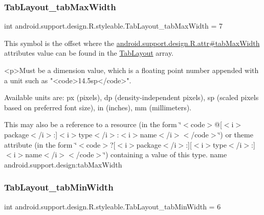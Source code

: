 \subsubsection{\texorpdfstring{Tab\+Layout\+\_\+tab\+Max\+Width}{TabLayout\_tabMaxWidth}}
{\footnotesize\ttfamily int android.\+support.\+design.\+R.\+styleable.\+Tab\+Layout\+\_\+tab\+Max\+Width = 7\hspace{0.3cm}{\ttfamily [static]}}

This symbol is the offset where the \hyperlink{classandroid_1_1support_1_1design_1_1R_1_1attr_a650581c154950889e3bd6241f121f180}{android.\+support.\+design.\+R.\+attr\#tab\+Max\+Width} attribute\textquotesingle{}s value can be found in the \hyperlink{classandroid_1_1support_1_1design_1_1R_1_1styleable_a514b47b47f600f9421b65f4f0aa832d6}{Tab\+Layout} array.

\begin{DoxyVerb}      <p>Must be a dimension value, which is a floating point number appended with a unit such as "<code>14.5sp</code>".
\end{DoxyVerb}
 Available units are\+: px (pixels), dp (density-\/independent pixels), sp (scaled pixels based on preferred font size), in (inches), mm (millimeters). 

This may also be a reference to a resource (in the form \char`\"{}$<$code$>$@\mbox{[}$<$i$>$package$<$/i$>$\+:\mbox{]}$<$i$>$type$<$/i$>$\+:$<$i$>$name$<$/i$>$$<$/code$>$\char`\"{}) or theme attribute (in the form \char`\"{}$<$code$>$?\mbox{[}$<$i$>$package$<$/i$>$\+:\mbox{]}\mbox{[}$<$i$>$type$<$/i$>$\+:\mbox{]}$<$i$>$name$<$/i$>$$<$/code$>$\char`\"{}) containing a value of this type.  name android.\+support.\+design\+:tab\+Max\+Width \mbox{\label{classandroid_1_1support_1_1design_1_1R_1_1styleable_a5409f5cd527dbb046dbf6c0b239045f1}} 
\subsubsection{\texorpdfstring{Tab\+Layout\+\_\+tab\+Min\+Width}{TabLayout\_tabMinWidth}}
{\footnotesize\ttfamily int android.\+support.\+design.\+R.\+styleable.\+Tab\+Layout\+\_\+tab\+Min\+Width = 6\hspace{0.3cm}{\ttfamily [static]}}

